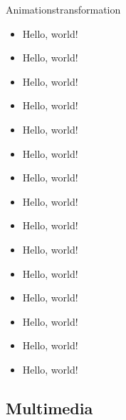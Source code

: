\documentclass[xcolor=table]{beamer}
\begin{document}
    \begin{frame}{Animations}{transformation}
        \begin{itemize}[<+->]
            \small
            \item Hello, world!
            \item Hello, world!
            \item Hello, world!
            \item Hello, world!
            \item Hello, world!
            \item Hello, world!
            \item Hello, world!
            \item Hello, world!
            \item Hello, world!
            \item Hello, world!
            \item Hello, world!
            \item Hello, world!
            \item Hello, world!
            \item Hello, world!
            \item Hello, world!
        \end{itemize}

    \end{frame}

    \subsection{Multimedia}


\end{document}

